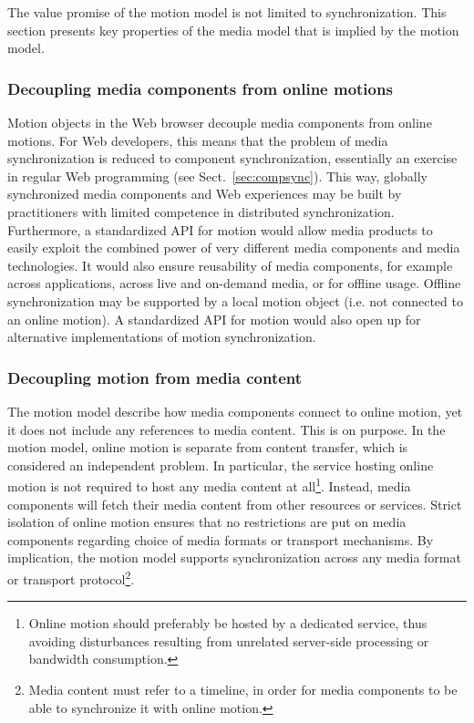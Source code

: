 The value promise of the motion model is not limited to synchronization. This
section presents key properties of the media model that is implied by the
motion model.

\subsubsection{Decoupling media components from online motions} 

Motion objects in the Web browser decouple media components from online
motions. For Web developers, this means that the problem of media
synchronization is reduced to component synchronization, essentially an
exercise in regular Web programming (see Sect.~\ref{sec:compsync}). This way,
globally synchronized media components and Web experiences may be built by
practitioners with limited competence in distributed synchronization.
Furthermore, a standardized API for motion would allow media products to
easily exploit the combined power of very different media components and media
technologies. It would also ensure reusability of media components, for
example across applications, across live and on-demand media, or for offline
usage. Offline synchronization may be supported by a local motion object (i.e.
not connected to an online motion). A standardized API for motion would also
open up for alternative implementations of motion synchronization.

\subsubsection{Decoupling motion from media content}

The motion model describe how media components connect to online motion, yet
it does not include any references to media content. This is on purpose. In
the motion model, online motion is separate from content transfer, which is
considered an independent problem. In particular, the service hosting online
motion is not required to host any media content at all\footnote{Online motion
should preferably be hosted by a dedicated service, thus avoiding disturbances
resulting from unrelated server-side processing or bandwidth consumption.}.
Instead, media components will fetch their media content from other resources
or services. Strict isolation of online motion ensures that no restrictions
are put on media components regarding choice of media formats or transport
mechanisms. By implication, the motion model supports synchronization across
any media format or transport protocol\footnote{Media content must refer to a
timeline, in order for media components to be able to synchronize it with
online motion.}.

